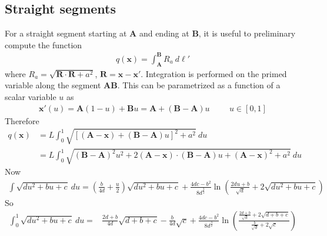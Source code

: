 \documentclass[10pt]{report}
\begin{document}
{\subsection{Straight segments}
For a straight segment starting at $\bm A$ and ending at $\bm B$, it is useful to preliminary compute the function
\begin{align}
q(\bm x)=\int_{\bm A}^{\bm B}R_a\ d\ell'
\end{align}
where $R_a=\sqrt{\bm R\cdot\bm R+a^2}$, $\bm R=\bm x-\bm x'$. Integration is performed on the primed variable along the segment $\bm A\bm B$. This can be parametrized as a function of a scalar variable $u$ as
\begin{align}
\bm x'(u)=\bm A(1-u)+\bm Bu=\bm A+(\bm B-\bm A)u\hspace{1cm} u\in[0,1]
\end{align}
Therefore
\begin{align}
q(\bm x)&=L\int_0^1\sqrt{[(\bm A-\bm x)+(\bm B-\bm A)u]^2+a^2}\ du\nonumber\\
&=L\int_0^1\sqrt{(\bm B-\bm A)^2u^2+2(\bm A-\bm x)\cdot(\bm B-\bm A)u+(\bm A-\bm x)^2+a^2}\ du
\end{align}
Now
\begin{align}
\int\sqrt{du^2+bu+c}\ du=\left(\frac{b}{4d}+\frac{u}{2}\right)\sqrt{du^2+bu+c}+\frac{4dc-b^2}{8d^\frac{3}{2}}\ln\left(\frac{2du+b}{\sqrt{d}}+2\sqrt{du^2+bu+c}\right)
\end{align}
So
\begin{align}
\int_0^1\sqrt{du^2+bu+c}\ du=&\frac{2d+b}{4d}\sqrt{d+b+c}-\frac{b}{4d}\sqrt{c}+\frac{4dc-b^2}{8d^\frac{3}{2}}\ln\left(\frac{\frac{2d+b}{\sqrt{d}}+2\sqrt{d+b+c}}{\frac{b}{\sqrt{d}}+2\sqrt{c}}\right)
\end{align}

}
\end{document}
